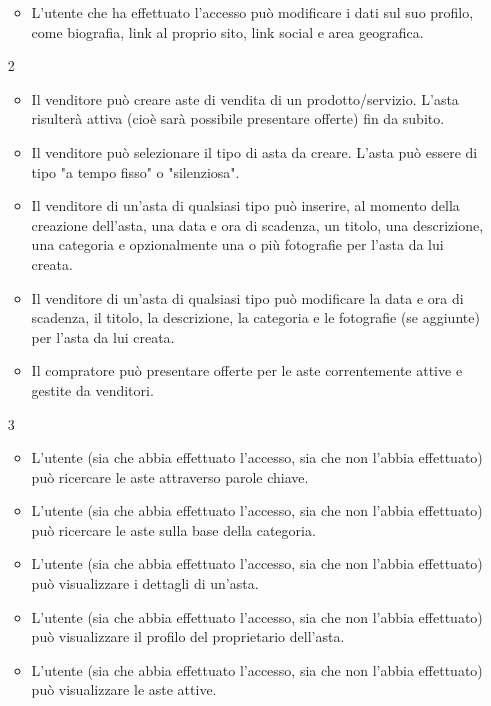 \begin{itemize}
\begin{itemize}
                    \item L'utente che ha effettuato l'accesso può modificare i dati sul suo profilo, come biografia, link al proprio sito, link social e area geografica.
                \end{itemize}
            \item[2] 
                \begin{itemize}
                    \item Il venditore può creare aste di vendita di un prodotto/servizio. L'asta risulterà attiva (cioè sarà possibile presentare offerte) fin da subito.
                    \item Il venditore può selezionare il tipo di asta da creare. L'asta può essere di tipo "a tempo fisso" o "silenziosa".
                    \item Il venditore di un'asta di qualsiasi tipo può inserire, al momento della creazione dell'asta, una data e ora di scadenza, un titolo, una descrizione, una categoria e opzionalmente una o più fotografie per l'asta da lui creata.
                    \item Il venditore di un'asta di qualsiasi tipo può modificare la data e ora di scadenza, il titolo, la descrizione, la categoria e le fotografie (se aggiunte) per l'asta da lui creata.
                    \item Il compratore può presentare offerte per le aste correntemente attive e gestite da venditori.
                \end{itemize}
            \item[3]
                \begin{itemize}
                    \item L'utente (sia che abbia effettuato l'accesso, sia che non l'abbia effettuato) può ricercare le aste attraverso parole chiave.
                    \item L'utente (sia che abbia effettuato l'accesso, sia che non l'abbia effettuato) può ricercare le aste sulla base della categoria.
                    \item L'utente (sia che abbia effettuato l'accesso, sia che non l'abbia effettuato) può visualizzare i dettagli di un'asta.
                    \item L'utente (sia che abbia effettuato l'accesso, sia che non l'abbia effettuato) può visualizzare il profilo del proprietario dell'asta.
                    \item L'utente (sia che abbia effettuato l'accesso, sia che non l'abbia effettuato) può visualizzare le aste attive.

\end{itemize}
\end{itemize}
